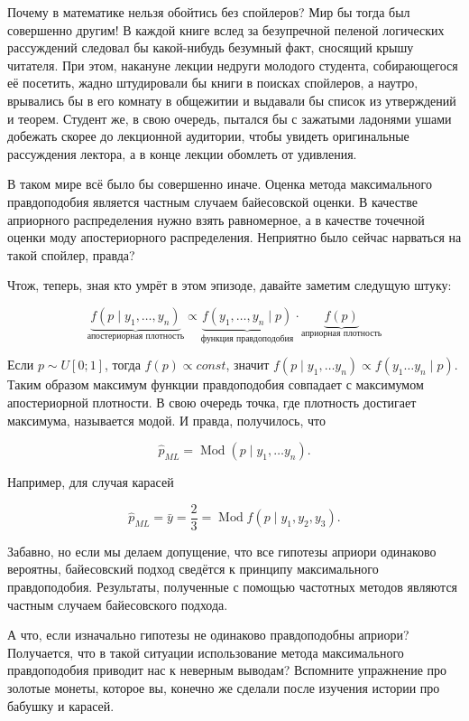 \documentclass[12pt, a4paper, oneside]{extreport}
\DeclareMathOperator{\Mod}{Mod}
\theoremstyle{plain}              %
\theoremstyle{definition}         %
\begin{document}
Почему в математике нельзя обойтись без спойлеров? Мир бы тогда был совершенно другим! В каждой книге вслед за безупречной пеленой логических рассуждений следовал бы какой-нибудь безумный факт, сносящий крышу читателя. При этом, накануне лекции недруги молодого студента, собирающегося её посетить, жадно штудировали бы книги в поисках спойлеров, а наутро, врывались бы в его комнату в общежитии и выдавали бы список из утверждений и теорем. Студент же, в свою очередь, пытался бы с зажатыми ладонями ушами добежать скорее до лекционной аудитории, чтобы увидеть оригинальные рассуждения лектора, а в конце лекции обомлеть от удивления.

В таком мире всё было бы совершенно иначе. Оценка метода максимального правдоподобия является частным случаем байесовской оценки. В качестве априорного распределения нужно взять равномерное, а в качестве точечной оценки моду апостериорного распределения. Неприятно было сейчас нарваться на такой спойлер, правда?

Чтож, теперь, зная кто умрёт в этом эпизоде, давайте заметим следущую штуку: 

\[ \underbrace{f(p \mid y_1, \ldots, y_n)}_{\text{апостериорная плотность}} \propto \underbrace{f(y_1, \ldots, y_n \mid p)}_{\text{функция правдоподобия}} \cdot \underbrace{f(p)}_{\text{априорная плотность}} \]  

Если $p \sim U[0;1]$, тогда $f(p) \propto const$, значит $f(p \mid y_1, \ldots y_n) \propto f(y_1 \ldots y_n \mid p)$. Таким образом максимум функции правдоподобия совпадает с максимумом апостериорной плотности. В свою очередь точка, где плотность достигает максимума, называется модой.
И правда, получилось,  что

\[\hat p_{ML} = \Mod(p \mid y_1, \ldots y_n). \]

Например, для случая карасей

\[ \hat p_{ML} = \bar{y} = \frac{2}{3} = \Mod f(p \mid y_1,y_2,y_3). \]

Забавно, но если мы делаем допущение, что все гипотезы априори одинаково вероятны, байесовский подход сведётся к принципу максимального правдоподобия. Результаты, полученные с помощью частотных методов являются частным случаем байесовского подхода. 

А что, если изначально гипотезы не одинаково правдоподобны априори? Получается, что в такой ситуации использование метода максимального правдоподобия приводит нас к неверным выводам? Вспомните упражнение про золотые монеты, которое вы, конечно же сделали после изучения истории про бабушку и карасей.
\end{document}
